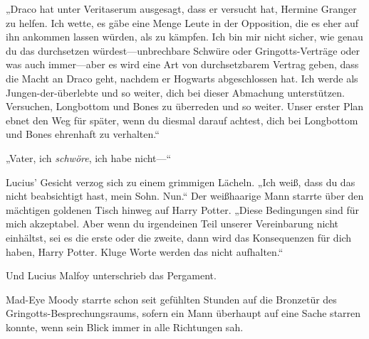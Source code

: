 „Draco hat unter Veritaserum ausgesagt, dass er versucht hat, Hermine Granger zu helfen. Ich wette, es gäbe eine Menge Leute in der Opposition, die es eher auf ihn ankommen lassen würden, als zu kämpfen. Ich bin mir nicht sicher, wie genau du das durchsetzen würdest—unbrechbare Schwüre oder Gringotts-Verträge oder was auch immer—aber es wird eine Art von durchsetzbarem Vertrag geben, dass die Macht an Draco geht, nachdem er Hogwarts abgeschlossen hat. Ich werde als Jungen-der-überlebte und so weiter, dich bei dieser Abmachung unterstützen. Versuchen, Longbottom und Bones zu überreden und so weiter. Unser erster Plan ebnet den Weg für später, wenn du diesmal darauf achtest, dich bei Longbottom und Bones ehrenhaft zu verhalten.“

„Vater, ich \emph{schwöre}, ich habe nicht—“

Lucius’ Gesicht verzog sich zu einem grimmigen Lächeln.
„Ich weiß, dass du das nicht beabsichtigt hast, mein Sohn. Nun.“
Der weißhaarige Mann starrte über den mächtigen goldenen Tisch hinweg auf Harry Potter.
„Diese Bedingungen sind für mich akzeptabel. Aber wenn du irgendeinen Teil unserer Vereinbarung nicht einhältst, sei es die erste oder die zweite, dann wird das Konsequenzen für dich haben, Harry Potter. Kluge Worte werden das nicht aufhalten.“

Und Lucius Malfoy unterschrieb das Pergament.

\later

Mad-Eye Moody starrte schon seit gefühlten Stunden auf die Bronzetür des Gringotts-Besprechungsraums, sofern ein Mann überhaupt auf eine Sache starren konnte, wenn sein Blick immer in alle Richtungen sah.

